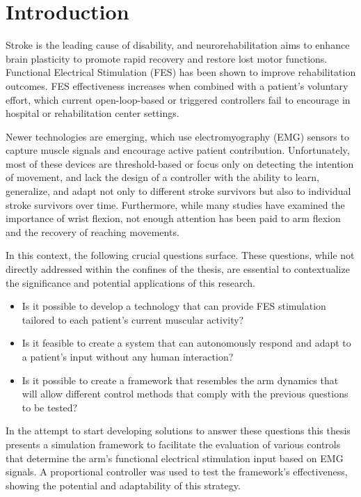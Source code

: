 \chapter{Introduction}

Stroke is the leading cause of disability, and neurorehabilitation aims to enhance brain plasticity to promote rapid recovery and restore lost motor functions. Functional Electrical Stimulation (FES) has been shown to improve rehabilitation outcomes. FES effectiveness increases when combined with a patient's voluntary effort, which current open-loop-based or triggered controllers fail to encourage in hospital or rehabilitation center settings.

Newer technologies are emerging, which use electromyography (EMG) sensors to capture muscle signals and encourage active patient contribution. Unfortunately, most of these devices are threshold-based or focus only on detecting the intention of movement, and lack the design of a controller with the ability to learn, generalize, and adapt not only to different stroke survivors but also to individual stroke survivors over time. Furthermore, while many studies have examined the importance of wrist flexion, not enough attention has been paid to arm flexion and the recovery of reaching movements.

In this context, the following crucial questions surface. These questions, while not directly addressed within the confines of the thesis, are essential to contextualize the significance and potential applications of this research. 

\begin{itemize}
    \item Is it possible to develop a technology that can provide FES stimulation tailored to each patient's current muscular activity?
    \item Is it feasible to create a system that can autonomously respond and adapt to a patient's input without any human interaction?
    \item Is it possible to create a framework that resembles the arm dynamics that will allow different control methods that comply with the previous questions to be tested?
\end{itemize}

In the attempt to start developing solutions to answer these questions this thesis presents a simulation framework to facilitate the evaluation of various controls that determine the arm's functional electrical stimulation input based on EMG signals. A proportional controller was used to test the framework's effectiveness, showing the potential and adaptability of this strategy. 

